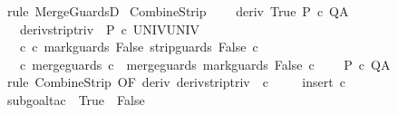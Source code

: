 \begin{isabellebody}
\ {\isacharparenleft}rule\ MergeGuardsD{\isacharparenright}\isanewline
{}\isamarkupfalse%
%
\endisatagproof
{\isafoldproof}%
%
\isadelimproof
\isanewline
%
\endisadelimproof
\isanewline
{}\isamarkupfalse%
\ CombineStrip{\isacharprime}{\isacharprime}{\isacharcolon}\ \isanewline
\ \ \ deriv{\isacharcolon}\ {\isachardoublequoteopen}{\isasymGamma}{\isacharcomma}{\isasymTheta}{\isasymturnstile}\isactrlbsub {\isacharslash}{\isacharbraceleft}True{\isacharbraceright}\isactrlesub \ P\ c{\isacharprime}\ Q{\isacharcomma}A{\isachardoublequoteclose}\isanewline
\ \ \ deriv{\isacharunderscore}strip{\isacharunderscore}triv{\isacharcolon}\ {\isachardoublequoteopen}{\isasymGamma}{\isacharcomma}{\isacharbraceleft}{\isacharbraceright}{\isasymturnstile}\isactrlbsub {\isacharslash}{\isacharbraceleft}{\isacharbraceright}\isactrlesub \ P\ c{\isacharprime}{\isacharprime}\ UNIV{\isacharcomma}UNIV{\isachardoublequoteclose}\isanewline
\ \ \ c{\isacharprime}{\isacharprime}{\isacharcolon}\ {\isachardoublequoteopen}c{\isacharprime}{\isacharprime}{\isacharequal}\ mark{\isacharunderscore}guards\ False\ {\isacharparenleft}strip{\isacharunderscore}guards\ {\isacharparenleft}{\isacharbraceleft}False{\isacharbraceright}{\isacharparenright}\ c{\isacharprime}{\isacharparenright}{\isachardoublequoteclose}\isanewline
\ \ \ c{\isacharcolon}\ {\isachardoublequoteopen}merge{\isacharunderscore}guards\ c\ {\isacharequal}\ merge{\isacharunderscore}guards\ {\isacharparenleft}mark{\isacharunderscore}guards\ False\ c{\isacharprime}{\isacharparenright}{\isachardoublequoteclose}\isanewline
\ \ \ {\isachardoublequoteopen}{\isasymGamma}{\isacharcomma}{\isasymTheta}{\isasymturnstile}\isactrlbsub {\isacharslash}{\isacharbraceleft}{\isacharbraceright}\isactrlesub \ P\ c\ Q{\isacharcomma}A{\isachardoublequoteclose}\isanewline
%
\isadelimproof
\ \ %
\endisadelimproof
%
\isatagproof
{}\isamarkupfalse%
\ {\isacharparenleft}rule\ CombineStrip{\isacharprime}\ {\isacharbrackleft}OF\ deriv\ deriv{\isacharunderscore}strip{\isacharunderscore}triv\ {\isacharunderscore}\ c{\isacharbrackright}{\isacharparenright}\ \isanewline
\ \ \isamarkupfalse%
\ {\isacharparenleft}insert\ c{\isacharprime}{\isacharprime}{\isacharparenright}\isanewline
\ \ \isamarkupfalse%
\ {\isacharparenleft}subgoal{\isacharunderscore}tac\ {\isachardoublequoteopen}{\isacharminus}\ {\isacharbraceleft}True{\isacharbraceright}\ {\isacharequal}\ {\isacharbraceleft}False{\isacharbraceright}{\isachardoublequoteclose}{\isacharparenright}\isanewline

\end{isabellebody}
